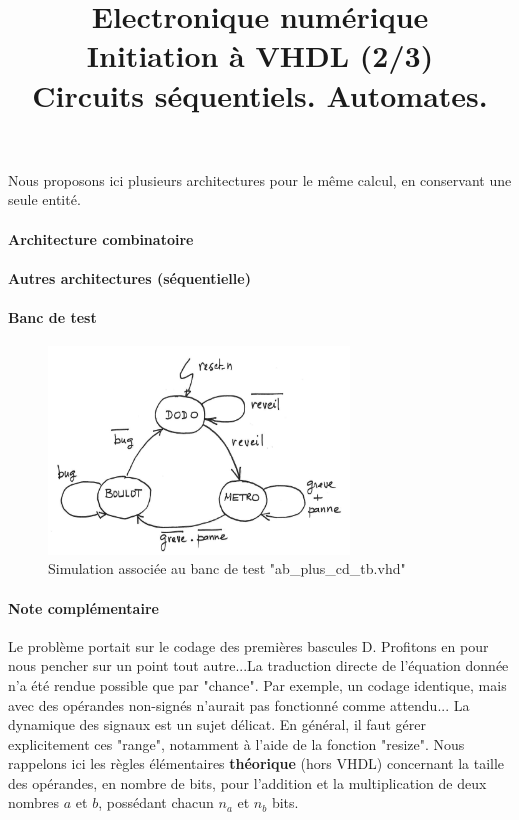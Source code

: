 \documentclass[a4paper,11pt]{article}
\title{{\Huge Electronique numérique}\\Initiation à VHDL (2/3)\\Circuits séquentiels. Automates.\\ \color{red}{CORRECTIONS}}
\date{}
\begin{document}
\maketitle



Nous proposons ici plusieurs architectures pour le même calcul, en conservant une seule entité.
\paragraph{Architecture combinatoire}

\lstset{inputencoding=utf8}


\paragraph{Autres architectures (séquentielle)}
\lstset{inputencoding=utf8}


\paragraph{Banc de test}

\begin{figure}
  \centering
  \includegraphics[width=8cm]{./iloveparis.png}
  \caption{Simulation associée au banc de test "ab\_plus\_cd\_tb.vhd"}
  \label{ab_plus_bc}
\end{figure}



\paragraph{Note complémentaire}
Le problème portait sur le codage des premières bascules D. Profitons en pour nous pencher sur un point tout autre...La traduction directe de l'équation donnée n'a
été rendue possible que par "chance". Par exemple, un codage identique, mais avec des opérandes non-signés n'aurait pas fonctionné comme attendu...
La dynamique des signaux est un sujet délicat. En général, il faut gérer explicitement ces "range", notamment à l'aide de la fonction "resize".
Nous rappelons ici les règles élémentaires \textbf{théorique} (hors VHDL) concernant la taille des opérandes, en nombre de bits, pour l'addition
et la multiplication de deux nombres $a$ et $b$, possédant chacun $n_a$ et $n_b$ bits.
\end{document}
